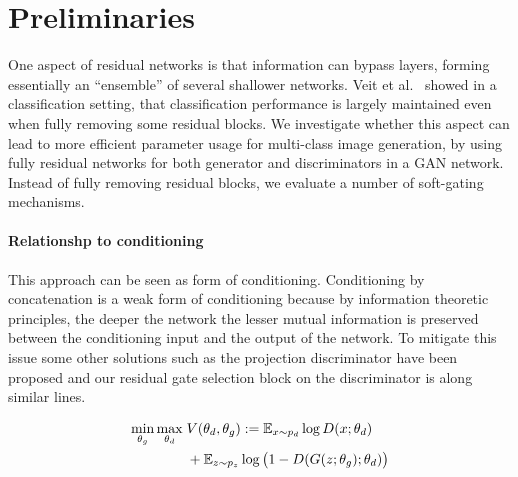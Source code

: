 \section{Preliminaries}
\newcommand{\addSubFigHalf}[3]{\begin{subfigure}[t]{.45\linewidth}
   \texttt{[image: \#1]}
   \caption{#2}\label{#3}\end{subfigure}
}


One aspect of residual networks is that information can bypass layers, forming essentially an ``ensemble'' of several shallower networks.
Veit et al.~\cite{veit2016residual} showed in a classification setting, that classification performance is largely maintained even when fully removing some residual blocks.
We investigate whether this aspect can lead to more efficient parameter usage for multi-class image generation, by using fully residual networks for both generator and discriminators in a GAN network.
Instead of fully removing residual blocks, we evaluate a number of soft-gating mechanisms.



\paragraph{Relationshp to conditioning}
This approach can be seen as form of conditioning. 
Conditioning by concatenation is a weak form of conditioning because by information theoretic principles, the deeper the network the lesser mutual information is preserved between the conditioning input and the output of the network. To mitigate this issue some other solutions such as the projection discriminator \cite{miyato2018cgans} have been proposed and our residual gate selection block on the discriminator is along similar lines. 


\begin{align}\label{eq:ganObjective}
     \min_{\theta_g}\max_{\theta_d}\; & V(\theta_d, \theta_g) := \operatorname{\mathbb{E}}_{x \sim p_{d}} \log D(x; \theta_d) \nonumber \\&
     + \operatorname{\mathbb{E}}_{z \sim p_z } \log \big( 1 - D(G(z; \theta_g) ; \theta_d)\big) 
\end{align}
